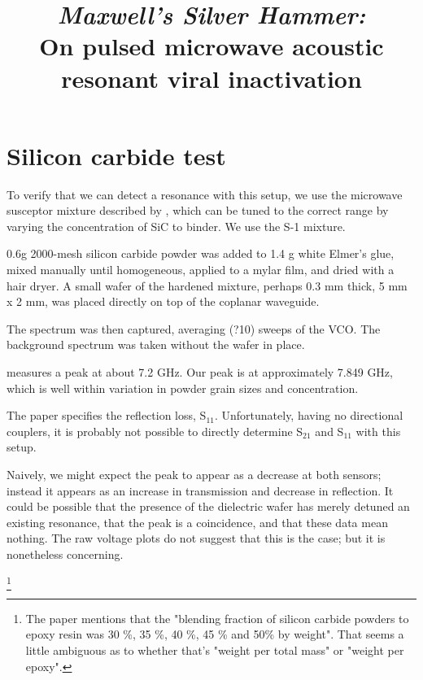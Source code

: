 \documentclass[fleqn,10pt]{paper}
\title{{\it Maxwell's Silver Hammer:}\\ On pulsed microwave acoustic resonant viral inactivation}
\begin{document}
\section{Silicon carbide test}

To verify that we can detect a resonance with this setup, we use the microwave susceptor mixture described by \cite{Effect2016}, which can be tuned to the correct range by varying the concentration of SiC to binder. We use the S-1 mixture.

0.6g 2000-mesh silicon carbide powder was added to 1.4 g white Elmer's glue, mixed manually until homogeneous,
applied to a mylar film, and dried with a hair dryer. A small wafer of the hardened mixture, perhaps 0.3 mm thick, 5 mm x 2 mm, was placed directly on top of the coplanar waveguide.


The spectrum was then captured, averaging (?10) sweeps of the VCO. The background spectrum was taken without the wafer in place.

\begin{figure}[H]
	
	\caption{}
\end{figure}

\begin{figure}[H]
	
	\caption{}
\end{figure}

\cite{Effect2016} measures a peak at about 7.2 GHz. Our peak is at approximately 7.849 GHz, which is well within variation in powder grain sizes and concentration.

The paper specifies the reflection loss, S$_{11}$. Unfortunately, having no directional couplers, it is probably not possible to directly determine S$_{21}$ and S$_{11}$ with this setup.

Naively, we might expect the peak to appear as a decrease at both sensors; instead it appears as an increase in transmission and decrease in reflection. It could be possible that the presence of the dielectric wafer has merely detuned an existing resonance, that the peak is a coincidence, and that these data mean nothing.
The raw voltage plots do not suggest that this is the case; but it is nonetheless concerning.

\footnote{The paper mentions that the "blending fraction of silicon carbide powders to epoxy resin was 30 \%, 35 \%, 40 \%, 45 \% and 50\% by weight". That seems a little ambiguous as to whether that's "weight per total mass" or "weight per epoxy".}
\end{document}
